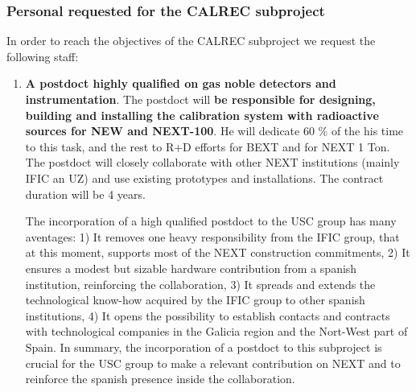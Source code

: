 %
%

\subsubsection*{Personal requested for the CALREC subproject}

In order to reach the objectives of the CALREC subproject we request the following staff:

\begin{enumerate}

\item {\bf A postdoct highly qualified on gas noble detectors and instrumentation}. The postdoct will {\bf be responsible for designing, building and installing the calibration system with radioactive sources for NEW and NEXT-100}. He will dedicate 60 \% of the his time to this task, and the rest to R+D efforts for BEXT and for NEXT 1 Ton. 
The postdoct will closely collaborate with other NEXT institutions (mainly IFIC an UZ) and use existing prototypes and installations. The contract duration will be 4 years.

The incorporation of a high qualified postdoct to the USC group has many aventages: 1) It removes one heavy responsibility from the IFIC group, that at this moment, supports most of the NEXT construction commitments, 2)  
It ensures a modest but sizable hardware contribution from a spanish institution, reinforcing the collaboration, 
3) It spreads and extends the technological know-how acquired by the IFIC group to other spanish institutions, 4) It opens the possibility to establish contacts and contracts with technological companies in the Galicia region and the Nort-West part of Spain. In summary, the incorporation of a postdoct to this subproject is crucial for the USC group to make a relevant contribution on NEXT and to reinforce the spanish presence inside the collaboration.


\end{enumerate}
